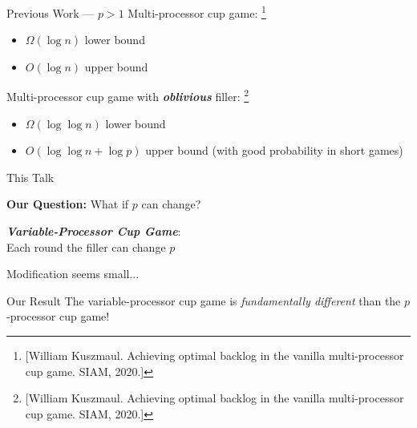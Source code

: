\documentclass[xcolor=x11names, svgnames, rgb]{beamer}
\newcommand{\defn}[1]       {{\textit{\textbf{\boldmath #1}}}}
\begin{document}
\begin{frame}[t]{Previous Work --- $p>1$}
  Multi-processor cup game: \footnote{[William Kuszmaul. Achieving optimal backlog in the vanilla multi-processor cup game. SIAM, 2020.]}
  \begin{itemize}
    \item $\Omega(\log n)$ lower bound
    \item $O(\log n)$ upper bound
  \end{itemize}

  Multi-processor cup game with \defn{oblivious} filler: \footnote{[William Kuszmaul. Achieving optimal backlog in the vanilla multi-processor cup game. SIAM, 2020.]}
  \begin{itemize}
    \item $\Omega(\log\log n)$ lower bound
    \item $O(\log\log n + \log p)$ upper bound (with good probability in short games)
  \end{itemize}
\end{frame}

\begin{frame}[t]{This Talk}

  \textbf{Our Question:} What if $p$ can change?
\vspace{1cm}

  \defn{Variable-Processor Cup Game}: \\
  Each round the filler can change $p$ 

\vspace{1cm}
Modification seems small...
\end{frame}

\begin{frame}[c]{Our Result}
  The variable-processor cup game is \emph{fundamentally different} than the $p$-processor cup game!
\end{frame}
\end{document}
